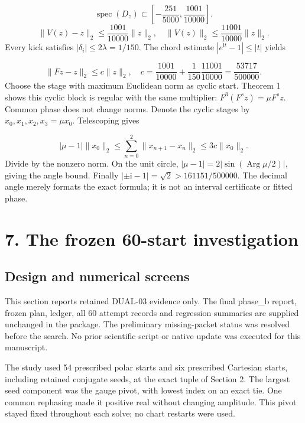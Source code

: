 \documentclass[11pt,a4paper]{article}
\begin{document}
\begin{equation}\operatorname{spec}(D_z)\subset\left[-\frac{251}{5000},\frac{1001}{10000}\right].\end{equation}
\begin{equation}\|V(z)-z\|_2\leq\frac{1001}{10000}\|z\|_2,\quad\|V(z)\|_2\leq\frac{11001}{10000}\|z\|_2.\end{equation}
Every kick satisfies $|\delta_i|\leq2\lambda=1/150$. The chord estimate $|e^{\mathrm{i}t}-1|\leq|t|$ yields

\begin{equation}\|Fz-z\|_2\leq c\|z\|_2,\quad c=\frac{1001}{10000}+\frac{1}{150}\frac{11001}{10000}=\frac{53717}{500000}.\end{equation}
Choose the stage with maximum Euclidean norm as cyclic start. Theorem 1 shows this cyclic block is regular with the same multiplier: $F^3(F^s z)=\mu F^s z$. Common phase does not change norms. Denote the cyclic stages by $x_0,x_1,x_2,x_3=\mu x_0$. Telescoping gives

\begin{equation}|\mu-1|\|x_0\|_2\leq\sum_{n=0}^2\|x_{n+1}-x_n\|_2\leq3c\|x_0\|_2.\end{equation}
Divide by the nonzero norm. On the unit circle, $|\mu-1|=2|\sin(\operatorname{Arg}\mu/2)|$, giving the angle bound. Finally $|\pm\mathrm{i}-1|=\sqrt{2}>161151/500000$. The decimal angle merely formats the exact formula; it is not an interval certificate or fitted phase.

\clearpage
\section*{7. The frozen 60-start investigation}
\subsection*{Design and numerical screens}
This section reports retained DUAL-03 evidence only. The final phase\_b report, frozen plan, ledger, all 60 attempt records and regression summaries are supplied unchanged in the package. The preliminary missing-packet status was resolved before the search. No prior scientific script or native update was executed for this manuscript. \cite{D03}

The study used 54 prescribed polar starts and six prescribed Cartesian starts, including retained conjugate seeds, at the exact tuple of Section 2. The largest seed component was the gauge pivot, with lowest index on an exact tie. One common rephasing made it positive real without changing amplitude. This pivot stayed fixed throughout each solve; no chart restarts were used.
\end{document}
